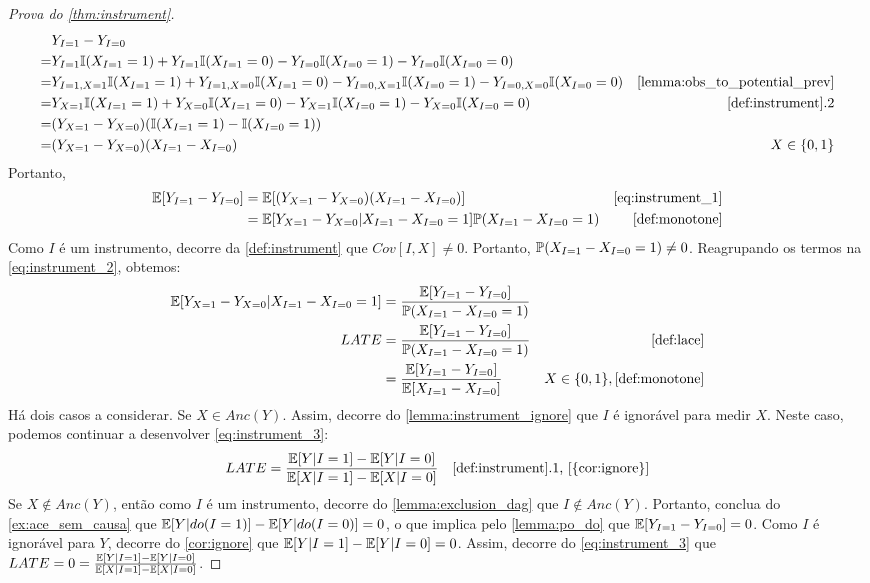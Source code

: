 \begin{proof}[Prova do \cref{thm:instrument}]
 \begin{align}
  \label{eq:instrument_1}
  & Y_{I=1} - Y_{I=0} 
  \nonumber \\
  =& Y_{I=1}\I(X_{I=1}=1) + Y_{I=1}\I(X_{I=1}=0)
  -Y_{I=0}\I(X_{I=0} =1) -Y_{I=0}\I(X_{I=0}=0) 
  \nonumber \\
  =& Y_{I=1,X=1}\I(X_{I=1}=1) + Y_{I=1,X=0}\I(X_{I=1}=0)
  -Y_{I=0,X=1}\I(X_{I=0} =1) -Y_{I=0,X=0}\I(X_{I=0}=0) 
  & \text{\cref{lemma:obs_to_potential_prev}} 
  \nonumber \\
  =& Y_{X=1}\I(X_{I=1}=1) + Y_{X=0}\I(X_{I=1}=0)
  -Y_{X=1}\I(X_{I=0} =1) -Y_{X=0}\I(X_{I=0}=0)
  & \text{\cref{def:instrument}.2} 
  \nonumber \\
  =& (Y_{X=1}-Y_{X=0})(\I(X_{I=1}=1)-\I(X_{I=0} =1)) 
  \nonumber \\
  =& (Y_{X=1}-Y_{X=0})(X_{I=1}-X_{I=0})
   & X \in \{0,1\}
 \end{align}
 Portanto,
 \begin{align}
  \label{eq:instrument_2}
  \E[Y_{I=1} - Y_{I=0}]
  &= \E[(Y_{X=1}-Y_{X=0})(X_{I=1}-X_{I=0})] 
  & \text{\cref{eq:instrument_1}} 
  \nonumber \\
  &= \E[Y_{X=1}-Y_{X=0}|X_{I=1}-X_{I=0}=1]\P(X_{I=1}-X_{I=0}=1) 
  & \text{\cref{def:monotone}} \\
 \end{align}
 Como $I$ é um instrumento,
 decorre da \cref{def:instrument} que $Cov[I,X] \neq 0$.
 Portanto, $\P(X_{I=1}-X_{I=0}=1) \neq 0$.
 Reagrupando os termos na \cref{eq:instrument_2}, 
 obtemos:
 \begin{align}
  \label{eq:instrument_3}
  \E[Y_{X=1}-Y_{X=0}|X_{I=1}-X_{I=0}=1]
  &= \frac{\E[Y_{I=1} - Y_{I=0}]}{\P(X_{I=1}-X_{I=0}=1)} 
  \nonumber \\
  \LACE
  &= \frac{\E[Y_{I=1} - Y_{I=0}]}{\P(X_{I=1}-X_{I=0}=1)}
  & \text{\cref{def:lace}} \\
  &= \frac{\E[Y_{I=1} - Y_{I=0}]}{\E[X_{I=1}-X_{I=0}]}
  & X \in \{0,1\}, \text{\cref{def:monotone}} \\
 \end{align}
 Há dois casos a considerar. 
 Se $X \in Anc(Y)$.
 Assim, decorre do \cref{lemma:instrument_ignore} que
 $I$ é ignorável para medir $X$. Neste caso,
 podemos continuar a desenvolver \cref{eq:instrument_3}:
 \begin{align*}
  \LACE 
  &= \frac{\E[Y|I=1] - \E[Y|I=0]}{\E[X|I=1] - \E[X|I=0]}
  & \text{\cref{def:instrument}.1, \cref{{cor:ignore}}}
 \end{align*}
 Se $X \notin Anc(Y)$, então
 como $I$ é um instrumento,
 decorre do \cref{lemma:exclusion_dag} que
 $I \notin Anc(Y)$. Portanto,
 conclua do \cref{ex:ace_sem_causa} que
 $\E[Y|do(I=1)]-\E[Y|do(I=0)] = 0$, o que implica
 pelo \cref{lemma:po_do} que
 $\E[Y_{I=1}-Y_{I=0}] = 0$.
 Como $I$ é ignorável para $Y$,
 decorre do \cref{cor:ignore} que
 $\E[Y|I=1]-\E[Y|I=0] = 0$.
 Assim, decorre do \cref{eq:instrument_3} que
 $\LACE = 0 = \frac{\E[Y|I=1] - \E[Y|I=0]}{\E[X|I=1] - \E[X|I=0]}$.
\end{proof}

